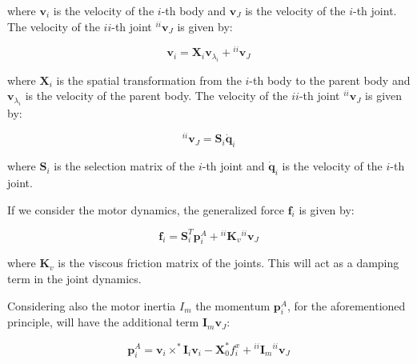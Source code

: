 where $\mathbf{v} _i$ is the velocity of the $i$-th body and $\mathbf{v} _J$ is the velocity of the $i$-th joint. The velocity of the $ii$-th joint ${} ^{ii}\mathbf{v} _J$ is given by:

\begin{equation}
    \mathbf{v} _i = \mathbf{X} _i \mathbf{v} _{\lambda _i} + {} ^{ii}\mathbf{v} _J
\end{equation}


where $\mathbf{X} _i$ is the spatial transformation from the $i$-th body to the parent body and $\mathbf{v} _{\lambda _i}$ is the velocity of the parent body. The velocity of the $ii$-th joint ${} ^{ii}\mathbf{v} _J$ is given by:

\begin{equation}
    {} ^{ii}\mathbf{v} _J = \mathbf{S} _i \dot{\mathbf{q}} _i
\end{equation}


where $\mathbf{S} _i$ is the selection matrix of the $i$-th joint and $\dot{\mathbf{q}} _i$ is the velocity of the $i$-th joint.

If we consider the motor dynamics, the generalized force $\mathbf{f} _i$ is given by:

\begin{equation}
    \mathbf{f} _i = \mathbf{S} ^T _i \mathbf{p} ^A _i + {} ^{ii} \mathbf{K} _v {} ^{ii}\mathbf{v} _J
\end{equation}


where $\mathbf{K} _v$ is the viscous friction matrix of the joints. This will act as a damping term in the joint dynamics.

Considering also the motor inertia $I _m$ the momentum $\mathbf{p} ^A _i$, for the aforementioned principle, will have the additional term $\mathbf{I} _m \mathbf{v} _J$:

\begin{equation}
    \mathbf{p} ^A _i = \mathbf{v} _i \times ^* \mathbf{I} _i \mathbf{v} _i - \mathbf{X} ^* _0 f ^x _i + {} ^{ii}\mathbf{I} _m {} ^{ii}\mathbf{v} _J
\end{equation}


